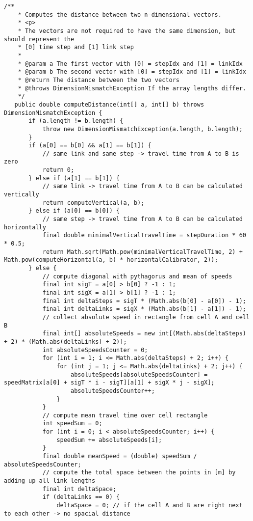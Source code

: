 \begin{lstlisting}[basicstyle=\tiny, style=java, caption={diagonal distance calculation}, label=lst:distance_calc_diagonal] 
	/**
	* Computes the distance between two n-dimensional vectors.
	* <p>
	* The vectors are not required to have the same dimension, but should represent the
	* [0] time step and [1] link step
	*
	* @param a The first vector with [0] = stepIdx and [1] = linkIdx
	* @param b The second vector with [0] = stepIdx and [1] = linkIdx
	* @return The distance between the two vectors
	* @throws DimensionMismatchException If the array lengths differ.
	*/
   public double computeDistance(int[] a, int[] b) throws DimensionMismatchException {
	   if (a.length != b.length) {
		   throw new DimensionMismatchException(a.length, b.length);
	   }
	   if (a[0] == b[0] && a[1] == b[1]) {
		   // same link and same step -> travel time from A to B is zero
		   return 0;
	   } else if (a[1] == b[1]) {
		   // same link -> travel time from A to B can be calculated vertically
		   return computeVertical(a, b);
	   } else if (a[0] == b[0]) {
		   // same step -> travel time from A to B can be calculated horizontally
		   final double minimalVerticalTravelTime = stepDuration * 60 * 0.5;
		   return Math.sqrt(Math.pow(minimalVerticalTravelTime, 2) + Math.pow(computeHorizontal(a, b) * horizontalCalibrator, 2));
	   } else {
		   // compute diagonal with pythagorus and mean of speeds
		   final int sigT = a[0] > b[0] ? -1 : 1;
		   final int sigX = a[1] > b[1] ? -1 : 1;
		   final int deltaSteps = sigT * (Math.abs(b[0] - a[0]) - 1);
		   final int deltaLinks = sigX * (Math.abs(b[1] - a[1]) - 1);
		   // collect absolute speed in rectangle from cell A and cell B
		   final int[] absoluteSpeeds = new int[(Math.abs(deltaSteps) + 2) * (Math.abs(deltaLinks) + 2)];
		   int absoluteSpeedsCounter = 0;
		   for (int i = 1; i <= Math.abs(deltaSteps) + 2; i++) {
			   for (int j = 1; j <= Math.abs(deltaLinks) + 2; j++) {
				   absoluteSpeeds[absoluteSpeedsCounter] = speedMatrix[a[0] + sigT * i - sigT][a[1] + sigX * j - sigX];
				   absoluteSpeedsCounter++;
			   }
		   }
		   // compute mean travel time over cell rectangle
		   int speedSum = 0;
		   for (int i = 0; i < absoluteSpeedsCounter; i++) {
			   speedSum += absoluteSpeeds[i];
		   }
		   final double meanSpeed = (double) speedSum / absoluteSpeedsCounter;
		   // compute the total space between the points in [m] by adding up all link lengths
		   final int deltaSpace;
		   if (deltaLinks == 0) {
			   deltaSpace = 0; // if the cell A and B are right next to each other -> no spacial distance

\end{lstlisting}
